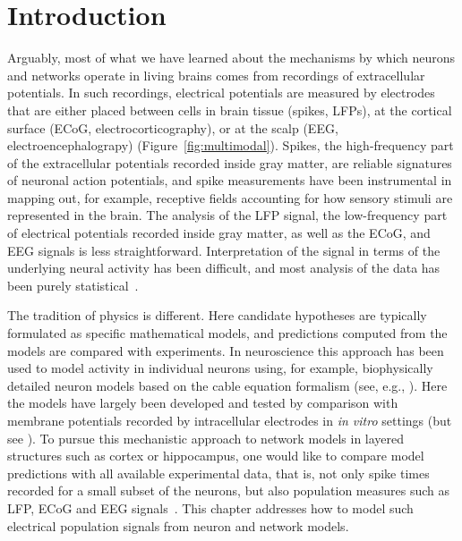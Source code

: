 \documentclass[preprint,11pt,authoryear]{elsarticle}
\begin{document}
\tableofcontents

\linenumbers

\section{Introduction}
\label{sec:introduction}

Arguably, most of what we have learned about the mechanisms by which neurons and networks operate in living brains comes from recordings of 
extracellular potentials. In such recordings, electrical potentials are measured by electrodes that are either placed between cells in brain tissue (spikes, LFPs), at the cortical surface (ECoG, electrocorticography), or at the scalp (EEG, electroencephalograpy) (Figure~\ref{fig:multimodal}). Spikes, the high-frequency part of the extracellular potentials recorded inside gray matter, are reliable signatures of neuronal action potentials, and spike measurements have been instrumental in mapping out, for example, receptive fields accounting for how sensory stimuli are represented in the brain. The analysis of the LFP signal, the low-frequency part of electrical potentials recorded inside gray matter, as well as the ECoG, and EEG signals is less straightforward. Interpretation of the signal in terms of the underlying neural activity has been difficult, and most analysis of the data has been purely statistical~\citep{Nunez2006,Buzsaki2012,Einevoll2013,Ilmoniemi2019}.

The tradition of physics is different. Here candidate hypotheses are typically formulated as specific mathematical models, and predictions computed from the models are compared with experiments. In neuroscience this approach has been used to model activity in individual neurons using, for example, biophysically detailed neuron models based on the cable equation formalism (see, e.g., \citet{Koch1999,Sterratt2011}).  
Here the models have largely been developed and tested by comparison with membrane potentials recorded by intracellular electrodes in 
\emph{in vitro} settings (but see \citet{Gold2007}).
To pursue this mechanistic approach to network models in layered structures such as cortex or hippocampus, 
one would like to compare model predictions with all available experimental data, that is, not only spike times recorded for a small subset of the neurons, but also population measures such as LFP, ECoG and EEG signals~\citep{Einevoll2019}. This chapter addresses how to model such electrical population signals from neuron and network models.
\end{document}
